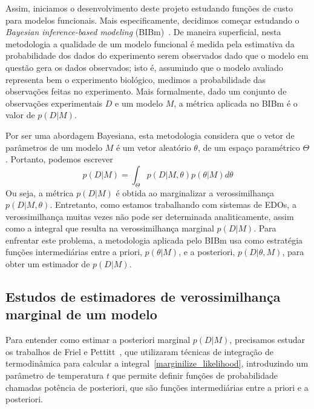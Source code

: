\documentclass[12pt]{article}
\begin{document}
Assim, iniciamos o desenvolvimento deste projeto estudando funções de
custo para modelos funcionais. Mais especificamente, decidimos começar
estudando o {\em Bayesian inference-based modeling} (BIBm)~\cite{Xu2010}.
De maneira superficial, nesta metodologia a qualidade de um modelo 
funcional é medida pela estimativa da probabilidade dos dados do 
experimento serem observados dado que o modelo em questão gera os dados 
observados; isto é, assumindo que o modelo avaliado representa bem o
experimento biológico, medimos a probabilidade das observações feitas
no experimento. Mais formalmente, dado um conjunto de observações
experimentais $D$ e um modelo $M$, a métrica aplicada no BIBm é o valor
de $p (D | M)$.

Por ser uma abordagem Bayesiana, esta metodologia considera que o vetor
de parâmetros de um modelo $M$ é um vetor aleatório $\theta$, de um
espaço paramétrico $\Theta$. Portanto, podemos escrever
\begin{equation}\label{marginilize_likelihood}
    p (D | M) = \int_{\Theta} p (D | M, \theta) p (\theta | M) d\theta
\end{equation}
Ou seja, a métrica $p (D|M)$ é obtida ao marginalizar a verossimilhança
$p (D | M, \theta)$. Entretanto, como estamos trabalhando com sistemas
de EDOs, a verossimilhança muitas vezes não pode ser determinada 
analiticamente, assim como a integral que resulta na verossimilhança
marginal $p (D | M)$. Para enfrentar este problema, a metodologia 
aplicada pelo BIBm usa como estratégia funções intermediárias entre a 
priori, $p (\theta | M)$, e a posteriori, $p (D | \theta, M)$, para 
obter um estimador de $p (D|M)$.

\subsection{Estudos de estimadores de verossimilhança marginal de um 
modelo}\label{estudos_de_estimadores}
Para entender como estimar a posteriori marginal $p (D | M)$, 
precisamos estudar os trabalhos de Friel e Pettitt~\cite{Friel2008}, que
utilizaram técnicas de integração de termodinâmica para calcular a 
integral~\ref{marginilize_likelihood}, introduzindo um parâmetro de 
temperatura $t$ que permite definir funções de probabilidade chamadas 
potência de posteriori, que são funções intermediárias entre a priori
e a posteriori.
\end{document}

